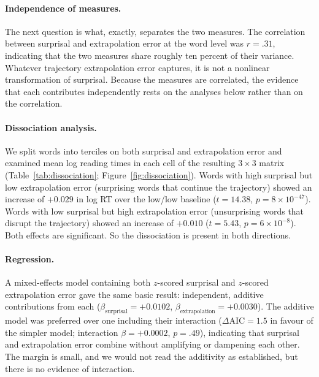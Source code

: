 \documentclass[12pt]{article}
\newcommand{\new}[1]{#1}   %
\begin{document}
\paragraph{Independence of measures.} \new{The next question is what, exactly, separates the two measures.} The correlation between surprisal and extrapolation error at the word level was \new{$r = .31$, indicating that the two measures share roughly ten percent of their variance}. Whatever trajectory extrapolation error captures, it is not a nonlinear transformation of surprisal. \new{Because the measures are correlated, the evidence that each contributes independently rests on the analyses below rather than on the correlation.}

\paragraph{Dissociation analysis.} We split words into terciles on both surprisal and extrapolation error and examined mean log reading times in each cell of the resulting $3 \times 3$ matrix (Table~\ref{tab:dissociation}; Figure~\ref{fig:dissociation}). Words with high surprisal but low extrapolation error (surprising words that continue the trajectory) showed an increase of \new{$+0.029$} in log RT over the low/low baseline (\new{$t = 14.38$, $p = 8 \times 10^{-47}$}). Words with low surprisal but high extrapolation error (unsurprising words that disrupt the trajectory) showed an increase of \new{$+0.010$} (\new{$t = 5.43$, $p = 6 \times 10^{-8}$}). Both effects are significant. So the dissociation is present in both directions.

\paragraph{Regression.} A mixed-effects model containing both $z$-scored surprisal and $z$-scored extrapolation error gave the same basic result: independent\new{, additive contributions from each ($\beta_{\text{surprisal}} = +0.0102$, $\beta_{\text{extrapolation}} = +0.0030$). The additive model was preferred over one including their interaction ($\Delta\text{AIC} = 1.5$ in favour of the simpler model; interaction $\beta = +0.0002$, $p = .49$), indicating that surprisal and extrapolation error combine without amplifying or dampening each other. The margin is small, and we would not read the additivity as established, but there is no evidence of interaction.}
\end{document}
